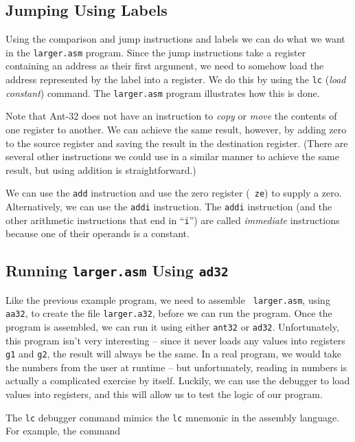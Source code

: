 \subsection{Jumping Using Labels}

Using the comparison and jump instructions and labels we can do
what we want in the {\tt larger.asm} program.  Since the jump
instructions take a register containing an address as their first
argument, we need to somehow load the address represented by the label
into a register.  We do this by using the {\tt lc} ({\em load
constant}) command.  The {\tt larger.asm} program illustrates how this
is done.



Note that Ant-32 does not have an instruction to {\em
copy} or {\em move} the contents of one register to another.  We can
achieve the same result, however, by adding zero to the source
register and saving the result in the destination register.  (There
are several other instructions we could use in a similar manner to
achieve the same result, but using addition is straightforward.)

We can use the {\tt add} instruction and use the zero register ({\tt
ze}) to supply a zero.  Alternatively, we can use the {\tt addi}
instruction.  The {\tt addi} instruction (and the other arithmetic
instructions that end in ``{\tt i}'') are called {\em immediate}
instructions because one of their operands is a constant.

\subsection{Running {\tt larger.asm} Using {\tt ad32}}

Like the previous example program, we need to assemble {\tt
larger.asm}, using {\tt aa32}, to create the file {\tt larger.a32},
before we can run the program.  Once the program is assembled, we can
run it using either {\tt ant32} or {\tt ad32}.  Unfortunately, this
program isn't very interesting -- since it never loads any values into
registers {\tt g1} and {\tt g2}, the result will always be the same. 
In a real program, we would take the numbers from the user at
runtime -- but unfortunately, reading in numbers is actually a
complicated exercise by itself.  Luckily, we can use the debugger to
load values into registers, and this will allow us to test the
logic of our program.

The {\tt lc} debugger command mimics the {\tt lc} mnemonic in
the assembly language.  For example, the command

